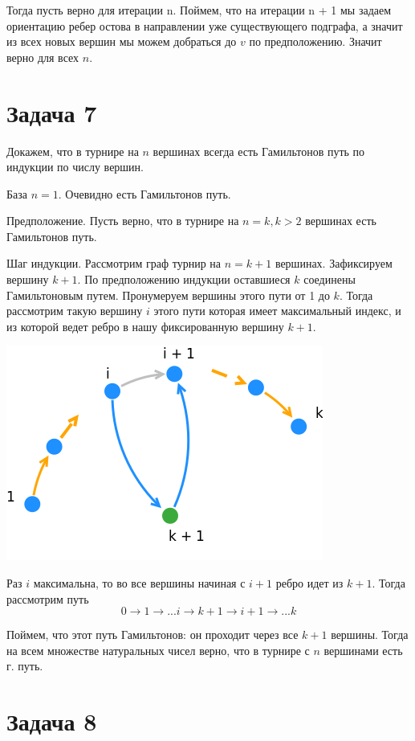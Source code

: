 \documentclass{article}
\begin{document}
	Тогда пусть верно для итерации n. Поймем, что на итерации n + 1 мы задаем ориентацию ребер остова в направлении уже существующего подграфа, а значит из всех новых вершин мы можем добраться до $v$ по предположению. Значит верно для всех $n$.
	
	\section{Задача 7}
	
	Докажем, что в турнире на $n$ вершинах всегда есть Гамильтонов путь по индукции по числу вершин.
	
	База $n=1$. Очевидно есть Гамильтонов путь.
	
	Предположение. Пусть верно, что в турнире на $n=k, k>2$ вершинах есть Гамильтонов путь.
	
	Шаг индукции. Рассмотрим граф турнир на $n=k + 1$ вершинах. Зафиксируем вершину $k + 1$. По предположению индукции оставшиеся $k$ соединены Гамильтоновым путем. Пронумеруем вершины этого пути от 1 до $k$. Тогда рассмотрим такую вершину $i$ этого пути которая имеет максимальный индекс, и из которой ведет ребро в нашу фиксированную вершину $k + 1$. 
\begin{center}
	\includegraphics[scale=0.5]{7_1}
\end{center}
	Раз $i$ максимальна, то во все вершины начиная с $i + 1$ ребро идет из $k + 1$. Тогда рассмотрим путь $$0 \longrightarrow 1 \longrightarrow ... i \longrightarrow k + 1 \longrightarrow i + 1 \longrightarrow ... k$$
	
	Поймем, что этот путь Гамильтонов: он проходит через все $k + 1$ вершины. Тогда на всем множестве натуральных чисел верно, что в турнире с $n$ вершинами есть г. путь.
	
	\section{Задача 8}
	
\end{document}
